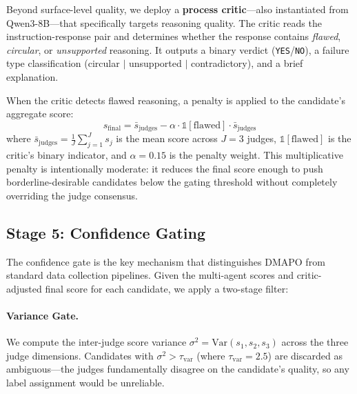\documentclass[10pt,twocolumn]{article}
\newcommand{\ours}{\textsc{DMAPO}}
\begin{document}
Beyond surface-level quality, we deploy a \textbf{process critic}---also instantiated from Qwen3-8B---that specifically targets reasoning quality.
The critic reads the instruction-response pair and determines whether the response contains \emph{flawed}, \emph{circular}, or \emph{unsupported} reasoning.
It outputs a binary verdict (\texttt{YES}/\texttt{NO}), a failure type classification (circular $|$ unsupported $|$ contradictory), and a brief explanation.

When the critic detects flawed reasoning, a penalty is applied to the candidate's aggregate score:
\begin{equation}
  s_{\text{final}} = \bar{s}_{\text{judges}} - \alpha \cdot \mathbb{1}[\text{flawed}] \cdot \bar{s}_{\text{judges}}
  \label{eq:critic_penalty}
\end{equation}
where $\bar{s}_{\text{judges}} = \frac{1}{J}\sum_{j=1}^{J} s_j$ is the mean score across $J{=}3$ judges, $\mathbb{1}[\text{flawed}]$ is the critic's binary indicator, and $\alpha{=}0.15$ is the penalty weight.
This multiplicative penalty is intentionally moderate: it reduces the final score enough to push borderline-desirable candidates below the gating threshold without completely overriding the judge consensus.


\subsection{Stage 5: Confidence Gating}
\label{sec:gating}

The confidence gate is the key mechanism that distinguishes \ours{} from standard data collection pipelines.
Given the multi-agent scores and critic-adjusted final score for each candidate, we apply a two-stage filter:

\paragraph{Variance Gate.}
We compute the inter-judge score variance $\sigma^2 = \text{Var}(s_1, s_2, s_3)$ across the three judge dimensions.
Candidates with $\sigma^2 > \tau_{\text{var}}$ (where $\tau_{\text{var}}{=}2.5$) are discarded as ambiguous---the judges fundamentally disagree on the candidate's quality, so any label assignment would be unreliable.
\end{document}
